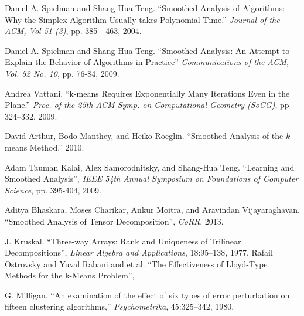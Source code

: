 \documentclass[11pt]{article}
\theoremstyle{definition}
\begin{document}
\begin{thebibliography}{1}
    Daniel A. Spielman and Shang{-}Hua Teng.
    ``Smoothed Analysis of Algorithms: Why the Simplex Algorithm Usually takes Polynomial Time.''
    \emph{Journal of the ACM, Vol 51 (3)},
    pp. 385 - 463,
    2004.

    Daniel A. Spielman and Shang{-}Hua Teng.
    ``Smoothed Analysis: An Attempt to Explain the Behavior of Algorithms in Practice''
    \emph{Communications of the ACM, Vol. 52 No. 10},
    pp. 76-84,
    2009.

    Andrea Vattani.
    ``k-means Requires Exponentially Many Iterations Even in the Plane.'' 
    \emph{ Proc. of the 25th ACM Symp. on Computational Geometry (SoCG)}, 
    pp 324–332, 
    2009.
    
    David Arthur, Bodo Manthey, and Heiko Roeglin.
    ``Smoothed Analysis of the $k$-means Method.''
    2010.

    Adam Tauman Kalai, Alex Samorodnitsky, and Shang{-}Hua Teng.
    ``Learning and Smoothed Analysis'',
    \emph{IEEE 54th Annual Symposium on Foundations of Computer Science}, 
    pp. 395-404,
    2009.

    Aditya Bhaskara, Moses Charikar, Ankur Moitra, and Aravindan Vijayaraghavan.
    ``Smoothed Analysis of Tensor Decomposition'',
    \emph{CoRR},
    2013.

    J. Kruskal. 
    ``Three-way Arrays: Rank and Uniqueness of Trilinear Decompositions'',
    \emph{Linear Algebra and Applications}, 
    18:95–138, 
    1977.
    Rafail Ostrovsky and Yuval Rabani and et al.
    ``The Effectiveness of Lloyd-Type Methods for the k-Means Problem'',

    G. Milligan. 
    ``An examination of the effect of six types of error perturbation on fifteen clustering
    algorithms,'' 
    \emph{Psychometrika}, 
    45:325–342, 1980.

\end{thebibliography}
\end{document}
